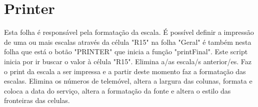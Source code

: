 \graphicspath{{Images/}}

\section{Printer}

Esta folha é responsável pela formatação da escala. É possível definir a impressão de uma ou mais escalas através da célula "R15" na folha "Geral" é também nesta folha que está o botão "PRINTER" que inicia a função "printFinal". Este script inicia por ir buscar o valor à célula "R15". Elimina a/as escala/s anterior/es. Faz o print da escala a ser impressa e a partir deste momento faz a formatação das escalas. Elimina os números de telemóvel, altera a largura das colunas, formata e coloca a data do serviço, altera a formatação da fonte e altera o estilo das fronteiras das celulas.